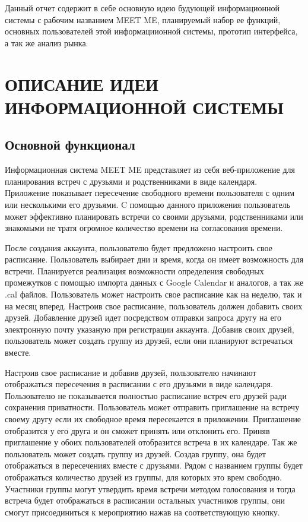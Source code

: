 \documentclass[14pt]{extreport}
\begin{document}
\pagestyle{empty} %



\pagestyle{plain} %
\tableofcontents
\intro\label{intro}

Данный отчет содержит в себе основную идею будующей информационной системы с рабочим названием MEET ME, планируемый набор ее функций, основных пользователей этой информациионной системы, прототип интерфейса, а так же анализ рынка.

\chapter{ОПИСАНИЕ ИДЕИ ИНФОРМАЦИОННОЙ СИСТЕМЫ \label{chapter1}}

\section{Основной функционал }

Информационная система MEET ME представляет из себя веб-приложение для планирования встреч с друзьями и родственниками в виде календаря. 
Приложение показывает пересечение свободного времени пользователя с одним или несколькими его друзьями.
C помощью данного приложения пользователь может эффективно планировать встречи со своими друзьями, родственниками или знакомыми не тратя огромное количество времени на согласования времени. 

После создания аккаунта, пользователю будет предложено настроить свое расписание. Пользователь выбирает дни и время, когда он имеет возможность для встречи. Планируется реализация возможности определения свободных промежутков с помощью импорта данных с Google Calendar и аналогов, а так же .cal файлов.
Пользователь может настроить свое расписание как на неделю, так и на месяц вперед. Настроив свое расписание, пользователь должен добавить своих друзей.  Добавление друзей идет посредством отправки запроса другу на его электронную почту указаную при регистрации аккаунта. Добавив своих друзей, пользователь может создать группу из друзей, если они планируют встречаться вместе.

Настроив свое расписание и добавив друзей, пользователю начинают отображаться пересечения в расписании с его друзьями в виде календаря. Пользователю не показывается полностью расписание встреч его друзей ради сохранения приватности. Пользователь может отправить приглашение на встречу своему другу если их свободное время пересекается в приложении. Приглашение отобразится у его друга и он сможет принять или отклонить его. Приняв приглашение у обоих пользователей отобразится встреча в их календаре. Так же пользователь может создать группу из друзей. Создав группу, она будет отображаться в пересечениях вместе с друзьями. Рядом с названием группы будет отображаться количество друзей из группы, для которых это врем свободно. Участники группы могут утвердить время встречи методом голосования и тогда встреча будет отображаться в расписании остальных участников группы, они смогут присоединиться к мероприятию нажав на соответствующую кнопку.
\end{document}
